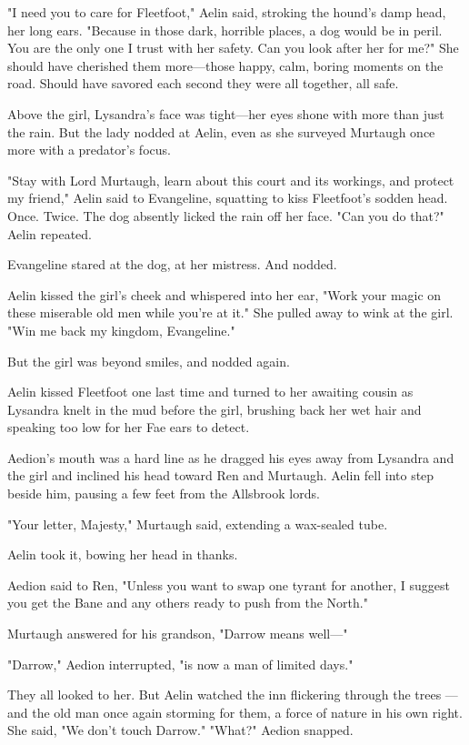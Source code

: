 "I need you to care for Fleetfoot," Aelin said, stroking the hound's damp head, her long ears.
"Because in those dark, horrible places, a dog would be in peril.
You are the only one I trust with her safety.
Can you look after her for me?"
She should have cherished them more---those happy, calm, boring moments on the road.
Should have savored each second they were all together, all safe.

Above the girl, Lysandra's face was tight---her eyes shone with more than just the rain.
But the lady nodded at Aelin, even as she surveyed Murtaugh once more with a predator's focus.

"Stay with Lord Murtaugh, learn about this court and its workings, and protect my friend," Aelin said to Evangeline, squatting to kiss Fleetfoot's sodden head.
Once.
Twice.
The dog absently licked the rain off her face.
"Can you do that?" Aelin repeated.

Evangeline stared at the dog, at her mistress.
And nodded.

Aelin kissed the girl's cheek and whispered into her ear, "Work your magic on these miserable old men while you're at it."
She pulled away to wink at the girl.
"Win me back my kingdom, Evangeline."

But the girl was beyond smiles, and nodded again.

Aelin kissed Fleetfoot one last time and turned to her awaiting cousin as Lysandra knelt in the mud before the girl, brushing back her wet hair and speaking too low for her Fae ears to detect.

Aedion's mouth was a hard line as he dragged his eyes away from Lysandra and the girl and inclined his head toward Ren and Murtaugh.
Aelin fell into step beside him, pausing a few feet from the Allsbrook lords.

"Your letter, Majesty," Murtaugh said, extending a wax-sealed tube.

Aelin took it, bowing her head in thanks.

Aedion said to Ren, "Unless you want to swap one tyrant for another, I suggest you get the Bane and any others ready to push from the North."

Murtaugh answered for his grandson, "Darrow means well---"

"Darrow," Aedion interrupted, "is now a man of limited days."

They all looked to her.
But Aelin watched the inn flickering through the trees ---and the old man once again storming for them, a force of nature in his own right.
She said, "We don't touch Darrow."
"What?" Aedion snapped.

